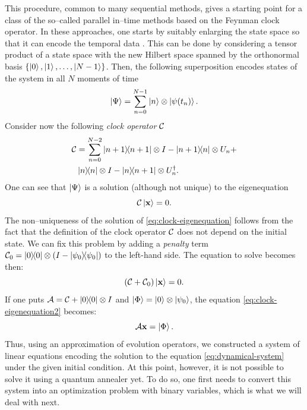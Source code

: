 This procedure, common to many sequential methods, gives a starting point for a class of the so--called parallel in--time methods based on the Feynman clock operator. In these approaches, one starts by suitably enlarging the state space so that it can encode the temporal data        . This can be done by considering a tensor product of a state space with the new Hilbert space spanned by the orthonormal basis $\{\ket{0}, \ket{1}, \ldots, \ket{N-1}\}$. Then, the following superposition encodes states of the system in all $N$ moments of time
%
\begin{equation}
    \ket{\Psi} = \sum_{n=0}^{N-1} \ket{n} \otimes \ket{\psi(t_n)}.
\end{equation}
Consider now the following \emph{clock operator} $\mathcal{C}$
\begin{eqnarray}
\label{eq:clock2}
 \mathcal{C}
   & =
\sum_{n=0}^{N-2}
\ketbra{n+1}{n+1} \otimes I - \ketbra{n+1}{n} \otimes U_n + \\
&\ketbra{n}{n} \otimes I - \ketbra{n}{n+1}\otimes U_{n}^{\dagger}.
\end{eqnarray}
One can see that $\ket{\Psi}$ is a solution (although not unique) to the eigenequation
\begin{equation}
\label{eq:clock-eigenequation}
\mathcal{C} \ket{\mathbf{x}} = 0.
\end{equation}
The non--uniqueness of the solution of \ref{eq:clock-eigenequation} follows from the fact that the
definition of the clock operator $\mathcal{C}$ does not depend on the initial state.
We can fix this problem by adding a \emph{penalty} term $\mathcal{C}_0 = \ketbra{0}{0}\otimes(I-\ketbra{\psi_0}{\psi_0})$ to the
left-hand side. The equation to solve becomes then:
\begin{equation}
  \label{eq:clock-eigenequation2}
  (\mathcal{C} + \mathcal{C}_0) \ket{\mathbf{x}} = 0.
\end{equation}
If one puts $\mathcal{A}=\mathcal{C} + \ketbra{0}{0} \otimes I$ and $\ket{\Phi} = \ket{0}\otimes \ket{\psi_0}$, the equation \ref{eq:clock-eigenequation2} becomes:
\begin{equation}
\label{eq:gsys}
\mathcal{A} \mathbf{x} = \ket{\Phi}.
\end{equation}
Thus, using an approximation of evolution operators, we constructed a system of linear equations encoding the solution to the equation \eqref{eq:dynamical-system} under the given initial condition. At this point, however, it is not possible to solve it using a quantum annealer yet. To do so, one first needs to convert this system into an optimization problem
with binary variables, which is what we will deal with next.
